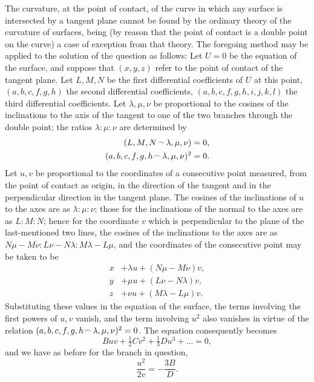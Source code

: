 \documentclass[11pt,a4paper]{book}
\begin{document}
The curvature, at the point of contact, of the curve in which any surface is intersected by a tangent plane cannot be found by the ordinary theory of the curvature of surfaces, being (by reason that the point of contact is a double point on the curve) a case of exception from that theory. The foregoing method may be applied to the solution of the question as follows: Let $U = 0$ be the equation of the surface, and suppose that $(x, y, z)$ refer to the point of contact of the tangent plane. Let $L, M, N$ be the first differential coefficients of $U$ at this point, $(a, b, c, f, g, h)$ the second differential coefficients, $(a, b, c, f, g, h, i, j, k, l)$ the third differential coefficients. Let $\lambda, \mu, \nu$ be proportional to the cosines of the inclinations to the axis of the tangent to one of the two branches through the double point; the ratios $\lambda : \mu : \nu$ are determined by
\begin{align*}
(L, M, N \mathbin{\vcenter{\hbox{$\scriptstyle\!\frown$}}} \lambda, \mu, \nu) &= 0,\\
(a, b, c, f, g, h \mathbin{\vcenter{\hbox{$\scriptstyle\!\frown$}}} \lambda, \mu, \nu)^2 &= 0.
\end{align*}
Let $u, v$ be proportional to the coordinates of a consecutive point measured, from the point of contact as origin, in the direction of the tangent and in the perpendicular direction in the tangent plane. The cosines of the inclinations of $u$ to the axes are as $\lambda : \mu : \nu$; those for the inclinations of the normal to the axes are as $L : M : N$; hence for the coordinate $v$ which is perpendicular to the plane of the last-mentioned two lines, the cosines of the inclinations to the axes are as $N\mu - M\nu : L\nu - N\lambda : M\lambda - L\mu$, and the coordinates of the consecutive point may be taken to be
\begin{align*}
x &+ \lambda u + (N\mu - M\nu)v,\\
y &+ \mu u + (L\nu - N\lambda)v,\\
z &+ \nu u + (M\lambda - L\mu)v.
\end{align*}
Substituting these values in the equation of the surface, the terms involving the first powers of $u, v$ vanish, and the term involving $u^2$ also vanishes in virtue of the relation $(a, b, c, f, g, h \mathbin{\vcenter{\hbox{$\scriptstyle\!\frown$}}} \lambda, \mu, \nu)^2 = 0$. The equation consequently becomes
\[
Buv + \tfrac{1}{2}Cv^2 + \tfrac{1}{3}Du^3 + \ldots = 0,
\]
and we have as before for the branch in question,
\[
\frac{u^2}{2v} = -\frac{3B}{D}.
\]
\end{document}
